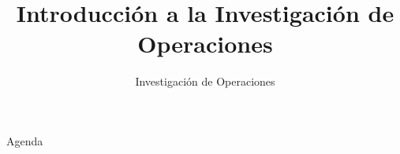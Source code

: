 \documentclass[../slides.tex]{subfiles}
\title{Introducción a la Investigación de Operaciones}
\subtitle{Investigación de Operaciones} %
\begin{document}
\begin{frame}
  \maketitle
\end{frame}


     \begin{frame}{Agenda}
   \tableofcontents
 \end{frame}






\begin{frame}
  \maketitle
\end{frame}
\end{document}
